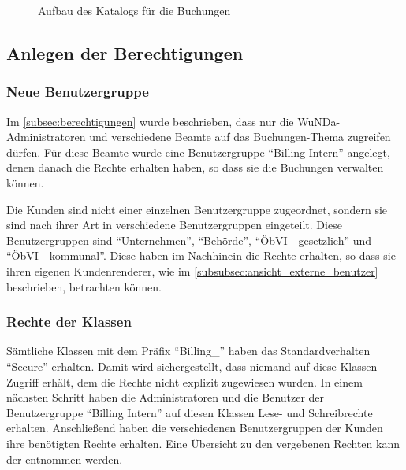 \begin{figure}[htb]
	\centering
	\caption{Aufbau des Katalogs für die Buchungen}
	\label{fig:katalog}
\end{figure}


\subsection{Anlegen der Berechtigungen}
\subsubsection{Neue Benutzergruppe}
Im \autoref{subsec:berechtigungen} wurde beschrieben, dass nur die \ac{WuNDa}-Administratoren und verschiedene Beamte auf das Buchungen-Thema zugreifen dürfen.
Für diese Beamte wurde eine Benutzergruppe "`Billing Intern"' angelegt, denen danach die Rechte erhalten haben, so dass sie die Buchungen verwalten können.

Die Kunden sind nicht einer einzelnen Benutzergruppe zugeordnet, sondern sie sind nach ihrer Art in verschiedene Benutzergruppen eingeteilt.
Diese Benutzergruppen sind "`Unternehmen"', "`Behörde"', "`ÖbVI - gesetzlich"' und "`ÖbVI - kommunal"'.
Diese haben im Nachhinein die Rechte erhalten, so dass sie ihren eigenen Kundenrenderer, wie im \autoref{subsubsec:ansicht_externe_benutzer} beschrieben, betrachten können.

\subsubsection{Rechte der Klassen}
Sämtliche Klassen mit dem Präfix "`Billing\_"' haben das Standardverhalten "`Secure"' erhalten. Damit wird sichergestellt, dass niemand auf diese Klassen Zugriff erhält, dem die Rechte nicht explizit zugewiesen wurden.
In einem nächsten Schritt haben die Administratoren und die Benutzer der Benutzergruppe "`Billing Intern"' auf diesen Klassen Lese- und Schreibrechte erhalten.
Anschließend haben die verschiedenen Benutzergruppen der Kunden ihre benötigten Rechte erhalten.
Eine Übersicht zu den vergebenen Rechten kann der  entnommen werden. 


